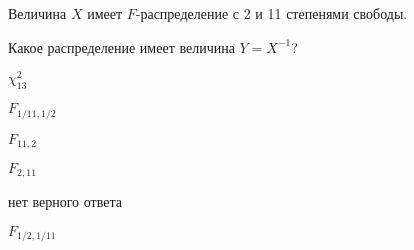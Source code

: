 
\begin{question}
Величина \(X\) имеет \(F\)-распределение с 2 и 11 степенями свободы.

Какое распределение имеет величина \(Y = X^{-1}\)?
\begin{answerlist}
  \item \(\chi^2_{13}\)
  \item \(F_{1/11, 1/2}\)
  \item \(F_{11, 2}\)
  \item \(F_{2, 11}\)
  \item нет верного ответа
  \item \(F_{1/2, 1/11}\)
\end{answerlist}
\end{question}


